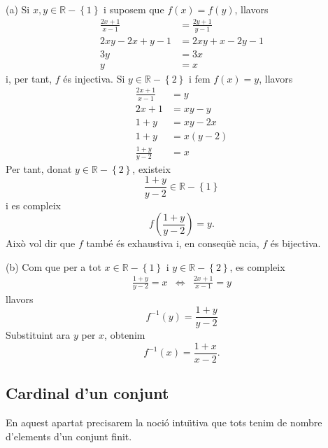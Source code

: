 \begin{solucio}
(a) Si $x,y\in\mathbb{R}-\left\{ 1\right\} $ i suposem que $f(x)=f(y)$,
llavors
\begin{align*}
\frac{2x+1}{x-1} & =\frac{2y+1}{y-1} \\
2xy-2x+y-1 & =2xy+x-2y-1 \\
3y & =3x \\
y & =x
\end{align*}
i, per tant, $f$ \'{e}s injectiva. Si $y\in\mathbb{R}-\left\{ 2\right\} $ i
fem $f(x)=y$, llavors%
\begin{align*}
\frac{2x+1}{x-1} & =y \\
2x+1 & =xy-y \\
1+y & =xy-2x \\
1+y & =x(y-2) \\
\frac{1+y}{y-2} & =x
\end{align*}
Per tant, donat $y\in\mathbb{R}-\left\{ 2\right\} $, existeix
\begin{equation*}
\frac{1+y}{y-2}\in\mathbb{R}-\left\{ 1\right\}
\end{equation*}
i es compleix%
\begin{equation*}
f\left( \frac{1+y}{y-2}\right) =y\text{.}
\end{equation*}
Aix\`{o} vol dir que $f$ tamb\'{e} \'{e}s exhaustiva i, en conseq\"{u}\`{e}%
ncia, $f$ \'{e}s bijectiva.

(b) Com que per a tot $x\in\mathbb{R}-\left\{ 1\right\} $ i $y\in \mathbb{R}%
-\left\{ 2\right\} $, es compleix
\begin{equation*}
\begin{array}{ccc}
\frac{1+y}{y-2}=x & \Longleftrightarrow & \frac{2x+1}{x-1}=y%
\end{array}
\end{equation*}
llavors%
\begin{equation*}
f^{-1}(y)=\frac{1+y}{y-2}
\end{equation*}
Substituint ara $y$ per $x$, obtenim%
\begin{equation*}
f^{-1}(x)=\frac{1+x}{x-2}\text{.}
\end{equation*}
\end{solucio}

\subsection{Cardinal d'un conjunt}

En aquest apartat precisarem la noci\'{o} intu\"{\i}tiva que tots tenim de
nombre d'elements d'un conjunt finit.

